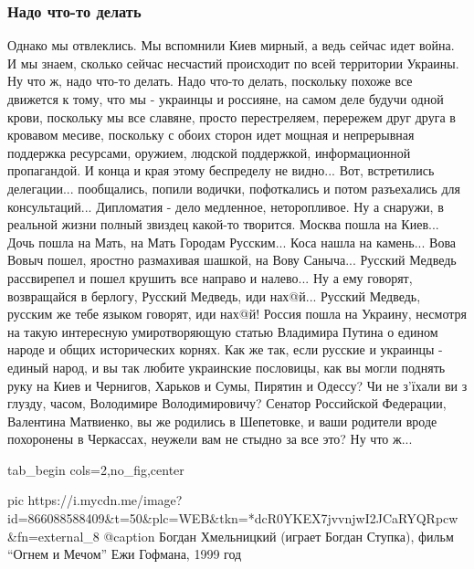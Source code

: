  
 
 
 
 

\subsubsection{Надо что-то делать}

Однако мы отвлеклись. Мы вспомнили Киев мирный, а ведь сейчас идет война. И мы
знаем, сколько сейчас несчастий происходит по всей территории Украины. Ну что
ж, надо что-то делать. Надо что-то делать, поскольку похоже все движется к
тому, что мы - украинцы и россияне, на самом деле будучи одной крови, поскольку
мы все славяне, просто перестреляем, перережем друг друга в кровавом месиве,
поскольку с обоих сторон идет мощная и непрерывная поддержка ресурсами,
оружием, людской поддержкой, информационной пропагандой. И конца и края этому
беспределу не видно... Вот, встретились делегации... пообщались, попили
водички, пофоткались и потом разъехались для консультаций... Дипломатия - дело
медленное, неторопливое. Ну а снаружи, в реальной жизни полный звиздец какой-то
творится. Москва пошла на Киев... Дочь пошла на Мать, на Мать Городам
Русским... Коса нашла на камень... Вова Вовыч пошел, яростно размахивая шашкой,
на Вову Саныча... Русский Медведь рассвирепел и пошел крушить все направо и
налево... Ну а ему говорят, возвращайся в берлогу, Русский Медведь, иди
нах@й... Русский Медведь, русским же тебе языком говорят, иди нах@й! Россия
пошла на Украину, несмотря на такую интересную умиротворяющую статью Владимира
Путина о едином народе и общих исторических корнях. Как же так, если русские и
украинцы - единый народ, и вы так любите украинские пословицы, как вы могли
поднять руку на Киев и Чернигов, Харьков и Сумы, Пирятин и Одессу? Чи не
з'їхали ви з глузду, часом, Володимире Володимировичу? Сенатор Российской
Федерации, Валентина Матвиенко, вы же родились в Шепетовке, и ваши родители
вроде похоронены в Черкассах, неужели вам не стыдно за все это? Ну что ж... 

\ifcmt
  tab_begin cols=2,no_fig,center

		 pic https://i.mycdn.me/image?id=866088588409&t=50&plc=WEB&tkn=*dcR0YKEX7jvvnjwI2JCaRYQRpcw&fn=external_8
		 @caption Богдан Хмельницкий (играет Богдан Ступка), фильм \enquote{Огнем и Мечом} Ежи Гофмана, 1999 год

